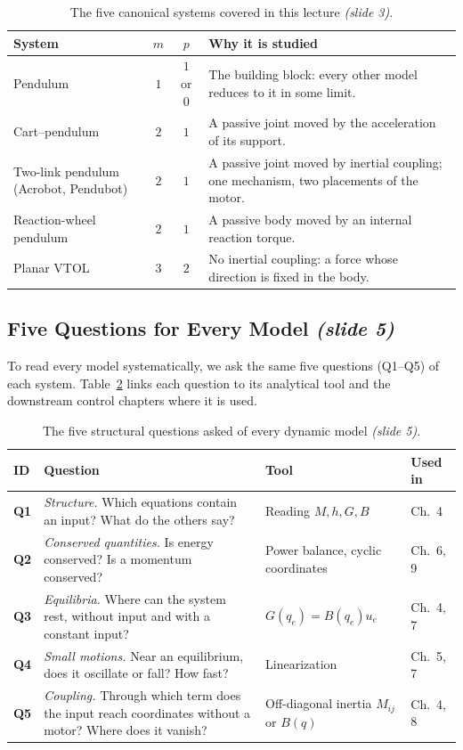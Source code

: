 \documentclass[11pt, a4paper]{article}
\theoremstyle{definition}
\theoremstyle{plain}
\begin{document}
\begin{table}[ht]
\centering
\caption{The five canonical systems covered in this lecture \emph{(slide 3)}.}
\label{tab:five_systems}
\renewcommand{\arraystretch}{1.2}
\begin{tabular}{@{}l c c p{8.4cm}@{}}
\toprule
\textbf{System} & $m$ & $p$ & \textbf{Why it is studied} \\
\midrule
Pendulum & $1$ & $1$ or $0$ & The building block: every other model reduces to it in some limit. \\
Cart--pendulum & $2$ & $1$ & A passive joint moved by the acceleration of its support. \\
Two-link pendulum (Acrobot, Pendubot) & $2$ & $1$ & A passive joint moved by inertial coupling; one mechanism, two placements of the motor. \\
Reaction-wheel pendulum & $2$ & $1$ & A passive body moved by an internal reaction torque. \\
Planar VTOL & $3$ & $2$ & No inertial coupling: a force whose direction is fixed in the body. \\
\bottomrule
\end{tabular}
\end{table}

\subsection{Five Questions for Every Model \emph{(slide 5)}}

To read every model systematically, we ask the same five questions (Q1--Q5) of each system. Table~\ref{tab:five_questions} links each question to its analytical tool and the downstream control chapters where it is used.

\begin{table}[ht]
\centering
\caption{The five structural questions asked of every dynamic model \emph{(slide 5)}.}
\label{tab:five_questions}
\renewcommand{\arraystretch}{1.2}
\begin{tabular}{@{}l p{6.8cm} p{3.6cm} l@{}}
\toprule
\textbf{ID} & \textbf{Question} & \textbf{Tool} & \textbf{Used in} \\
\midrule
\textbf{Q1} & \emph{Structure.} Which equations contain an input? What do the others say? & Reading $M, h, G, B$ & Ch.~4 \\
\textbf{Q2} & \emph{Conserved quantities.} Is energy conserved? Is a momentum conserved? & Power balance, cyclic coordinates & Ch.~6, 9 \\
\textbf{Q3} & \emph{Equilibria.} Where can the system rest, without input and with a constant input? & $G(q_e) = B(q_e)u_e$ & Ch.~4, 7 \\
\textbf{Q4} & \emph{Small motions.} Near an equilibrium, does it oscillate or fall? How fast? & Linearization & Ch.~5, 7 \\
\textbf{Q5} & \emph{Coupling.} Through which term does the input reach coordinates without a motor? Where does it vanish? & Off-diagonal inertia $M_{ij}$ or $B(q)$ & Ch.~4, 8 \\
\bottomrule
\end{tabular}
\end{table}
\end{document}
